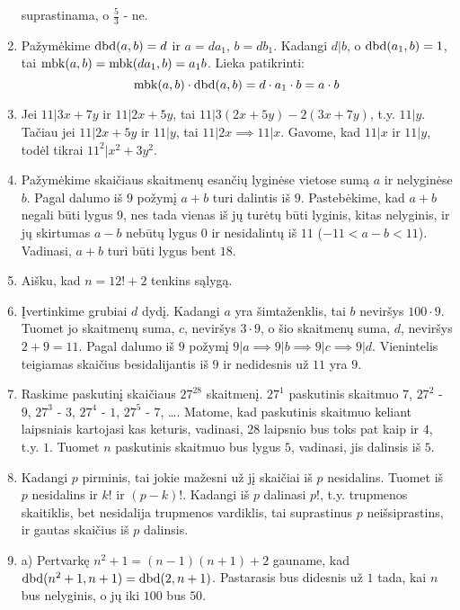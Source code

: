 \begin{enumerate}
    suprastinama, o $\frac{5}{3}$ - ne.
\item
    Pažymėkime $\operatorname{dbd}(a,b) = d$ ir $a=da_1$, $b=db_1$. Kadangi $d|b$, o
    $\operatorname{dbd}(a_1,b) = 1$, tai $\operatorname{mbk}(a,b) = \operatorname{mbk}(da_1, b)=a_1b$. Lieka
    patikrinti: $$\operatorname{mbk}(a,b)\cdot \operatorname{dbd}(a,b) = d \cdot a_1\cdot b = a\cdot b$$
\item
    Jei $11|3x+7y$ ir $11|2x+5y$, tai $11|3(2x+5y) - 2(3x + 7y)$, t.y.
    $11|y$. Tačiau jei $11|2x+5y$ ir $11|y$, tai $11|2x \implies
    11|x$. Gavome, kad $11|x$ ir $11|y$, todėl tikrai $11^2|x^2 + 3y^2$.
\item
    Pažymėkime skaičiaus skaitmenų esančių lyginėse vietose sumą
    $a$ ir nelyginėse $b$. Pagal dalumo iš $9$ požymį $a+b$ turi dalintis
    iš $9$. Pastebėkime, kad $a+b$ negali būti lygus $9$, nes tada vienas
    iš jų turėtų būti lyginis, kitas nelyginis, ir jų skirtumas $a-b$
    nebūtų lygus $0$ ir nesidalintų iš $11$ ($-11<a-b<11$). Vadinasi,
    $a+b$ turi būti lygus bent $18$.
\item
    Aišku, kad $n=12! + 2$ tenkins sąlygą.
\item
    Įvertinkime grubiai $d$ dydį. Kadangi $a$ yra šimtaženklis, tai
    $b$ neviršys $100\cdot 9$. Tuomet jo skaitmenų suma, $c$, neviršys
    $3\cdot 9$, o šio skaitmenų suma, $d$, neviršys $2 + 9 = 11$.
    Pagal dalumo iš $9$ požymį $9|a \implies 9|b \implies 9|c \implies
    9|d$. Vienintelis teigiamas skaičius besidalijantis iš $9$ ir
    nedidesnis už $11$ yra $9$.
\item
    Raskime paskutinį skaičiaus $27^{28}$ skaitmenį. $27^1$ paskutinis
    skaitmuo $7$, $27^2$ - $9$, $27^3$ - $3$, $27^4$ - $1$, $27^5$ - $7$,
    \dots. Matome, kad paskutinis skaitmuo keliant laipsniais kartojasi
    kas keturis, vadinasi, $28$ laipsnio bus toks pat kaip ir $4$, t.y.
    $1$. Tuomet $n$ paskutinis skaitmuo bus lygus $5$, vadinasi, jis
    dalinsis iš $5$. 
\item
    Kadangi $p$ pirminis, tai jokie mažesni už jį skaičiai iš $p$
    nesidalins. Tuomet iš $p$ nesidalins ir $k!$ ir $(p-k)!$. Kadangi iš
    $p$ dalinasi $p!$, t.y. trupmenos skaitiklis, bet nesidalija trupmenos
    vardiklis, tai suprastinus $p$ neišsiprastins, ir gautas skaičius iš
    $p$ dalinsis.
\item
    a) Pertvarkę $n^2 + 1 = (n-1)(n+1) + 2$ gauname, kad $\operatorname{dbd}(n^2 + 1, n+1)
    = \operatorname{dbd}(2, n+1)$. Pastarasis bus didesnis už $1$ tada, kai
    $n$ bus nelyginis, o jų iki $100$ bus $50$.
    

\end{enumerate}
